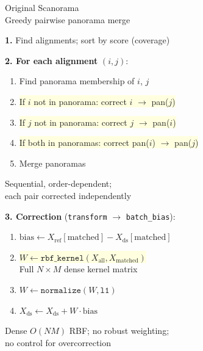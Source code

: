 \documentclass[8pt]{article}
\newlength{\colw}
\begin{document}
\noindent
\begin{minipage}[t]{\colw}
\begin{tcolorbox}[colback=hdrA, colframe=hdrA, fontupper=\bfseries\footnotesize\color{white},
    arc=2pt, left=2pt, right=2pt, top=1pt, bottom=1pt]
\centering Original Scanorama\\[-2pt]
{\scriptsize\mdseries Greedy pairwise panorama merge}
\end{tcolorbox}
\vspace{1pt}

\begin{stepbox}
\textbf{1.} Find alignments; sort by score (coverage)
\end{stepbox}\vspace{1pt}

\begin{warnbox}
\textbf{2. For each alignment} $(i, j)$:
\begin{enumerate}[leftmargin=1em, itemsep=0pt, topsep=1pt, parsep=0pt]
\item Find panorama membership of $i$, $j$
\item \colorbox{lightyellow}{If $i$ not in panorama: correct $i$ $\to$ pan($j$)}
\item \colorbox{lightyellow}{If $j$ not in panorama: correct $j$ $\to$ pan($i$)}
\item \colorbox{lightyellow}{If both in panoramas: correct pan($i$) $\to$ pan($j$)}
\item Merge panoramas
\end{enumerate}
{\scriptsize\color{removed} Sequential, order-dependent;\\
each pair corrected independently}
\end{warnbox}\vspace{1pt}

\begin{warnbox}
\textbf{3. Correction} (\texttt{transform} $\to$ \texttt{batch\_bias}):
\begin{enumerate}[leftmargin=1em, itemsep=0pt, topsep=1pt, parsep=0pt]
\item $\text{bias} \gets X_\text{ref}[\text{matched}] - X_\text{ds}[\text{matched}]$
\item \colorbox{lightyellow}{$W \gets \texttt{rbf\_kernel}(X_\text{all}, X_\text{matched})$}\\
    {\scriptsize Full $N \times M$ dense kernel matrix}
\item $W \gets \texttt{normalize}(W, \texttt{l1})$
\item $X_\text{ds} \gets X_\text{ds} + W \cdot \text{bias}$
\end{enumerate}
{\scriptsize\color{removed} Dense $O(NM)$ RBF; no robust weighting;\\
no control for overcorrection}
\end{warnbox}\vspace{1pt}


\end{minipage}
\end{document}
